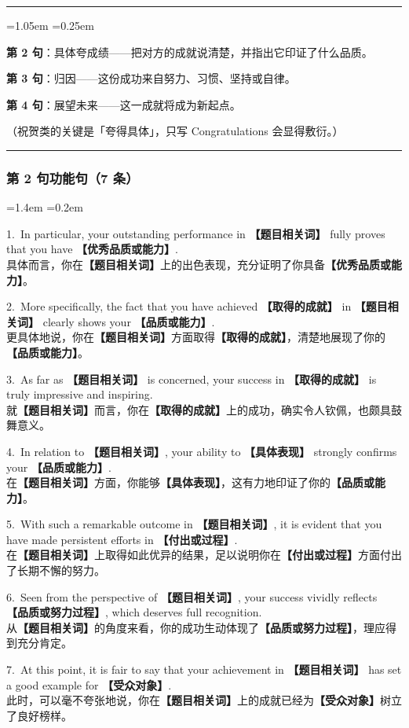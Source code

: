 \documentclass[11pt,a4paper]{ctexart}
\newcommand{\fillin}[1]{{\bfseries【#1】}}
\newenvironment{tpl}[1]{%
  \par\addvspace{7pt}\needspace{4\baselineskip}%
  \noindent{\bfseries\color{accent}#1}\par\nopagebreak
  \vspace{2pt}\noindent\rule{\linewidth}{0.7pt}\par\nopagebreak\vspace{3pt}%
  \begin{list}{}{\leftmargin=1.05em \rightmargin=0.25em \listparindent=0pt
    \itemindent=0pt \topsep=0pt \parsep=2.5pt \itemsep=2.5pt \partopsep=0pt}%
  \item\relax
}{%
  \end{list}\vspace{1pt}\noindent\rule{\linewidth}{0.7pt}\par\addvspace{8pt}%
}
\newenvironment{eg}{%
  \par\addvspace{4pt}%
  \begin{list}{}{\leftmargin=1.4em \rightmargin=0.2em \listparindent=0pt
    \itemindent=0pt \topsep=0pt \parsep=2pt \itemsep=2pt \partopsep=0pt}%
  \item\relax
}{%
  \end{list}\addvspace{5pt}%
}
\begin{document}
\begin{tpl}{祝贺类 · 第二段骨架}
\textbf{第 2 句}：具体夸成绩——把对方的成就说清楚，并指出它印证了什么品质。\par
\textbf{第 3 句}：归因——这份成功来自努力、习惯、坚持或自律。\par
\textbf{第 4 句}：展望未来——这一成就将成为新起点。\par
（祝贺类的关键是「夸得具体」，只写 Congratulations 会显得敷衍。）
\end{tpl}

\subsubsection{第 2 句功能句（7 条）}

\begin{eg}
1.\ In particular, your outstanding performance in \fillin{题目相关词} fully proves that you have \fillin{优秀品质或能力}.\\
具体而言，你在\fillin{题目相关词}上的出色表现，充分证明了你具备\fillin{优秀品质或能力}。

2.\ More specifically, the fact that you have achieved \fillin{取得的成就} in \fillin{题目相关词} clearly shows your \fillin{品质或能力}.\\
更具体地说，你在\fillin{题目相关词}方面取得\fillin{取得的成就}，清楚地展现了你的\fillin{品质或能力}。

3.\ As far as \fillin{题目相关词} is concerned, your success in \fillin{取得的成就} is truly impressive and inspiring.\\
就\fillin{题目相关词}而言，你在\fillin{取得的成就}上的成功，确实令人钦佩，也颇具鼓舞意义。

4.\ In relation to \fillin{题目相关词}, your ability to \fillin{具体表现} strongly confirms your \fillin{品质或能力}.\\
在\fillin{题目相关词}方面，你能够\fillin{具体表现}，这有力地印证了你的\fillin{品质或能力}。

5.\ With such a remarkable outcome in \fillin{题目相关词}, it is evident that you have made persistent efforts in \fillin{付出或过程}.\\
在\fillin{题目相关词}上取得如此优异的结果，足以说明你在\fillin{付出或过程}方面付出了长期不懈的努力。

6.\ Seen from the perspective of \fillin{题目相关词}, your success vividly reflects \fillin{品质或努力过程}, which deserves full recognition.\\
从\fillin{题目相关词}的角度来看，你的成功生动体现了\fillin{品质或努力过程}，理应得到充分肯定。

7.\ At this point, it is fair to say that your achievement in \fillin{题目相关词} has set a good example for \fillin{受众对象}.\\
此时，可以毫不夸张地说，你在\fillin{题目相关词}上的成就已经为\fillin{受众对象}树立了良好榜样。
\end{eg}
\end{document}

